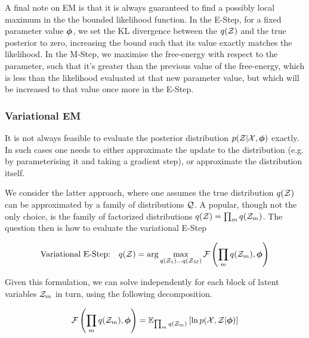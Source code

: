 A final note on EM is that it is always guaranteed to find a possibly local maximum in the the bounded likelihood function. In the E-Step, for a fixed parameter value ${ \bm \phi }$, we set the KL divergence between the $q({ \mathcal{Z} })$ and the true posterior to zero, increasing the bound such that its value exactly matches the likelihood. In the M-Step, we maximise the free-energy with respect to the parameter, such that it's greater than the previous value of the free-energy, which is less than the likelihood evaluated at that new parameter value, but which will be increased to that value once more in the E-Step.


\subsubsection{Variational EM}
It is not always feasible to evaluate the posterior distribution $p({ \mathcal{Z} }|{ \mathcal{X} }, { \bm \phi })$ exactly. In such cases one needs to either approximate the update to the distribution (e.g. by parameterising it and taking a gradient step), or approximate the distribution itself.

We consider the latter approach, where one assumes the true distribution $q({ \mathcal{Z} })$ can be approximated by a family of distributions ${ \mathcal{Q} }$. A popular, though not the only choice, is the family of factorized distributions $q({ \mathcal{Z} }) = \prod_m q({ \mathcal{Z} }_m)$. The question then is how to evaluate the variational E-Step

\begin{align*}
\text{Variational E-Step:} & & q({ \mathcal{Z} }) = \arg \max_{q({ \mathcal{Z} }_1) \ldots q({ \mathcal{Z} }_M)} { \mathcal{F}\left( {\prod_m q({ \mathcal{Z} }_m), { \bm \phi }} \right) }
\end{align*}

Given this formulation, we can solve independently for each block of latent variables ${ \mathcal{Z} }_m$ in turn, using the following decomposition.

\begin{align*}
{ \mathcal{F}\left( {\prod_m q( { \mathcal{Z} } _m),  {  \bm \phi  } } \right) } = { \mathbb{E}_{ { {\prod_m q({ \mathcal{Z} }_m)} } }\left[ { \ln { p( { \mathcal{X} } ,  { \mathcal{Z} } |  {  \bm \phi  } ) } } \right] }
\end{align*}




